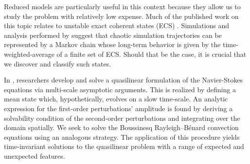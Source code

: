 \documentclass[reprint,amsmath,amssymb,aps]{revtex4-1}
\begin{document}
Reduced models are particularly useful in this context because they allow us to study the problem with relatively low expense. 
Much of the published work on this topic relates to unstable exact coherent states (ECS) \cite{Waleffe, Sondak, Wen,chini_cells}. 
Simulations and analysis performed by \cite{Yalniz, Cvitanovic} suggest that chaotic simulation trajectories can be represented by a Markov chain whose long-term behavior is given by the time-weighted-average of a finite set of ECS. Should that be the case, it is crucial that we discover and classify such states.

In \cite{michel_chini_2019}, researchers develop and solve a quasilinear formulation of the Navier-Stokes equations via multi-scale asymptotic arguments. This is realized by defining a mean state which, hypothetically, evolves on a slow time-scale. An analytic expression for the first-order perturbations' amplitude is found by deriving a solvability condition of the second-order perturbations and integrating over the domain spatially. 
We seek to solve the Boussinesq Rayleigh–Bénard convection equations using an analogous strategy. 
The application of this procedure yields time-invariant solutions to the quasilinear problem with a range of expected and unexpected features. 
\end{document}
